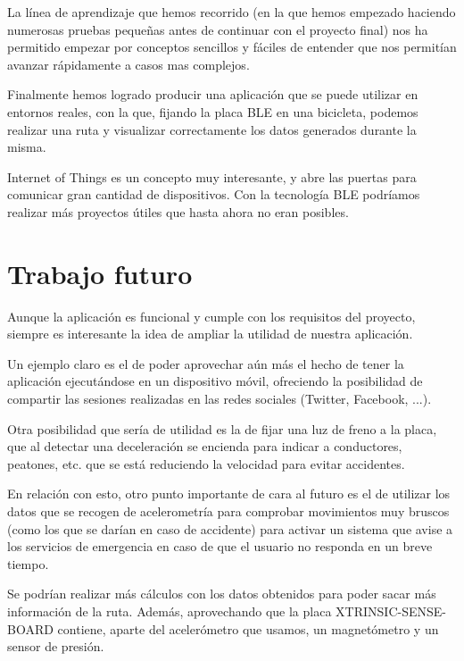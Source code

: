 La línea de aprendizaje que hemos recorrido (en la que hemos empezado haciendo numerosas pruebas pequeñas antes de continuar con el proyecto final) nos ha permitido empezar por conceptos sencillos y fáciles de entender que nos permitían avanzar rápidamente a casos mas complejos.

Finalmente hemos logrado producir una aplicación que se puede utilizar en entornos reales, con la que, fijando la placa BLE en una bicicleta, podemos realizar una ruta y visualizar correctamente los datos generados durante la misma.

Internet of Things es un concepto muy interesante, y abre las puertas para comunicar gran cantidad de dispositivos. Con la tecnología BLE podríamos realizar más proyectos útiles que hasta ahora no eran posibles.

\section{Trabajo futuro}

Aunque la aplicación es funcional y cumple con los requisitos del proyecto, siempre es interesante la idea de ampliar la utilidad de nuestra aplicación.

Un ejemplo claro es el de poder aprovechar aún más el hecho de tener la aplicación ejecutándose en un dispositivo móvil, ofreciendo la posibilidad de compartir las sesiones realizadas en las redes sociales (Twitter, Facebook, ...).

Otra posibilidad que sería de utilidad es la de fijar una luz de freno a la placa, que al detectar una deceleración se encienda para indicar a conductores, peatones, etc. que se está reduciendo la velocidad para evitar accidentes.

En relación con esto, otro punto importante de cara al futuro es el de utilizar los datos que se recogen de acelerometría para comprobar movimientos muy bruscos (como los que se darían en caso de accidente) para activar un sistema que avise a los servicios de emergencia en caso de que el usuario no responda en un breve tiempo.

Se podrían realizar más cálculos con los datos obtenidos para poder sacar más información de la ruta. Además, aprovechando que la placa XTRINSIC-SENSE-BOARD contiene, aparte del acelerómetro que usamos, un magnetómetro y un sensor de presión. 

